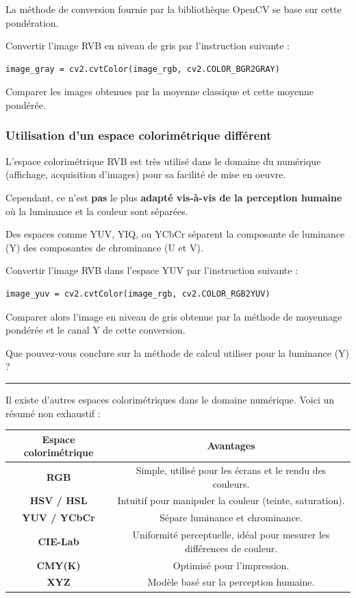 \documentclass[a4paper,11pt,titlepage]{article} %
\begin{document}
La méthode de conversion fournie par la bibliothèque OpenCV se base sur cette pondération.

\Manip Convertir l'image RVB en niveau de gris par l'instruction suivante :

\begin{lstlisting}
image_gray = cv2.cvtColor(image_rgb, cv2.COLOR_BGR2GRAY)
\end{lstlisting}

\Manip Comparer les images obtenues par la moyenne classique et cette moyenne pondérée.


\subsubsection{Utilisation d'un espace colorimétrique différent}

L'espace colorimétrique RVB est très utilisé dans le domaine du numérique (affichage, acquisition d'images) pour sa facilité de mise en oeuvre.

Cependant, ce n'est \textbf{pas} le plus \textbf{adapté vis-à-vis de la perception humaine} où la luminance et la couleur sont séparées.

Des espaces comme YUV, YIQ, ou YCbCr séparent la composante de luminance (Y) des composantes de chrominance (U et V).

\Manip Convertir l'image RVB dans l'espace YUV par l'instruction suivante :

\begin{lstlisting}
image_yuv = cv2.cvtColor(image_rgb, cv2.COLOR_RGB2YUV)
\end{lstlisting}

\Manip Comparer alors l'image en niveau de gris obtenue par la méthode de moyennage pondérée et le canal Y de cette conversion.

\Quest Que pouvez-vous conclure sur la méthode de calcul utiliser pour la luminance (Y) ?

\medskip

\noindent \rule{\linewidth}{1pt}

Il existe d'autres espaces colorimétriques dans le domaine numérique. Voici un résumé non exhaustif :

\begin{center}
\begin{tabular}{|c|c|}
\hline
\textbf{Espace colorimétrique} & \textbf{Avantages} \\ \hline
\textbf{RGB} & Simple, utilisé pour les écrans et le rendu des couleurs. \\ \hline
\textbf{HSV / HSL} & Intuitif pour manipuler la couleur (teinte, saturation). \\ \hline
\textbf{YUV / YCbCr} & Sépare luminance et chrominance. \\ \hline
\textbf{CIE-Lab} & Uniformité perceptuelle, idéal pour mesurer les différences de couleur. \\ \hline
\textbf{CMY(K)} & Optimisé pour l'impression. \\ \hline
\textbf{XYZ} & Modèle basé sur la perception humaine. \\ \hline
\end{tabular}
\end{center}
\end{document}
